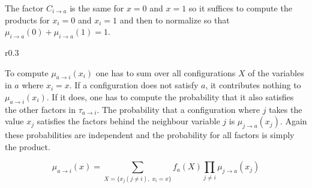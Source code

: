 The factor $C_{i \rightarrow a}$ is the same for $x=0$ and $x=1$ so it suffices to compute the products for $x_i = 0$ and $x_i = 1$ and then to normalize so that $\mu_{i\rightarrow a}(0) + \mu_{i \rightarrow a}(1) = 1$. \cite{lecture} 


\begin{wrapfigure}{r}{0.3\textwidth}

\end{wrapfigure}

To compute $\mu_{a \rightarrow i}(x_i)$ one has to sum over all configurations $X$ of the variables in $a$ where $x_i = x$. If a configuration does not satisfy $a$, it contributes nothing to $\mu_{a \rightarrow i}(x_i)$. If it does, one has to compute the probability that it also satisfies the other factors in $\tau_{a \rightarrow i}$. The probability that a configuration where $j$ takes the value $x_j$ satisfies the factors behind the neighbour variable $j$ is $\mu_{j \rightarrow a}(x_j)$. Again these probabilities are independent and the probability for all factors is simply the product.

$$\mu_{a \rightarrow i}(x) = \sum_{ X = \{x_j (j \neq i), \; x_i = x\}} f_a(X) \prod_{j \neq i} \mu_{j \rightarrow a}(x_j)$$


